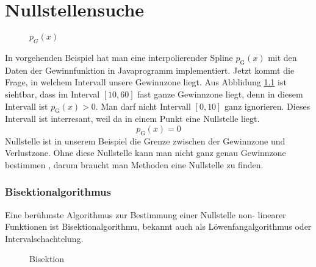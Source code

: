 \chapter{Nullstellensuche}
\begin{figure}[ht]
\centering
\def\svgwidth{1.00\textwidth}

\caption{$p_G(x)$}
\label{fig:a}

\end{figure}
In vorgehenden Beispiel hat man eine interpolierender Spline  $p_\textrm{G}(x)$ mit den Daten der Gewinnfunktion in Javaprogramm implementiert.
 Jetzt kommt die Frage, in welchem Intervall unsere Gewinnzone liegt. Aus Abblidung \ref{fig:a} ist siehtbar, dass im Interval $[10,60]$ fast ganze Gewinnzone liegt, denn in diesem Intervall ist  $p_\textrm{G}(x) > 0$.
Man darf nicht  Intervall $[0,10]$ ganz ignorieren. Dieses Intervall ist interresant, weil da in einem Punkt eine Nullstelle liegt.
$$p_\textrm{G}(x) =0$$
Nullstelle ist in unserem Beispiel die Grenze zwischen der Gewinnzone und Verlustzone. Ohne diese Nullstelle kann man nicht ganz genau Gewinnzone bestimmen , darum braucht man Methoden eine Nullstelle zu finden.

\subsection{Bisektionalgorithmus}
Eine berühmste Algorithmus zur Bestimmung  einer Nullstelle non- linearer Funktionen ist Bisektionalgorithmu, bekannt auch als Löwenfangalgorithmus oder Intervalschachtelung.
\begin{figure}[ht]
\centering
\def\svgwidth{1.00\textwidth}

\caption{Bisektion}
\label{fig:bar}
\end{figure}

